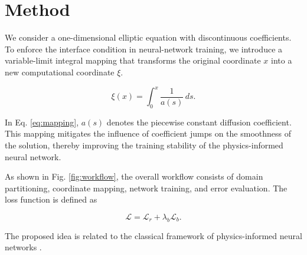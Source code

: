 \section{Method}
\label{sec:method}

We consider a one-dimensional elliptic equation with discontinuous coefficients. To enforce the interface condition in neural-network training, we introduce a variable-limit integral mapping that transforms the original coordinate $x$ into a new computational coordinate $\xi$.

\begin{equation}
\label{eq:mapping}
\xi(x)=\int_{0}^{x}\frac{1}{a(s)}\,ds .
\end{equation}

In Eq. \ref{eq:mapping}, $a(s)$ denotes the piecewise constant diffusion coefficient. This mapping mitigates the influence of coefficient jumps on the smoothness of the solution, thereby improving the training stability of the physics-informed neural network.

As shown in Fig. \ref{fig:workflow}, the overall workflow consists of domain partitioning, coordinate mapping, network training, and error evaluation. The loss function is defined as

\begin{equation}
\label{eq:loss}
\mathcal{L}=\mathcal{L}_{r}+\lambda_b\mathcal{L}_{b}.
\end{equation}

The proposed idea is related to the classical framework of physics-informed neural networks \cite{raissi2019physics}.
